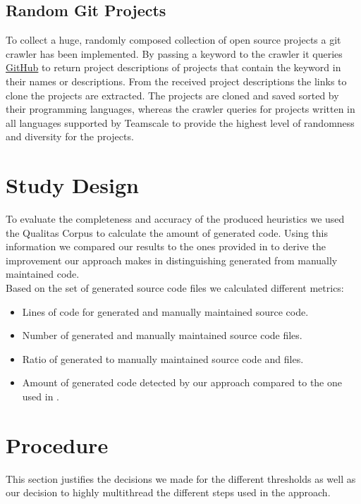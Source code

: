 \subsection{Random Git Projects}
\label{section:randomGitProjects}
To collect a huge, randomly composed collection of open source projects a git crawler has been implemented.
By passing a keyword to the crawler it queries \href{github.com}{GitHub} to return project descriptions of projects that contain the keyword in their names or descriptions. From the received project descriptions the links to clone the projects are extracted. The projects are cloned and saved sorted by their programming languages, whereas the crawler queries for projects written in all languages supported by Teamscale to provide the highest level of randomness and diversity for the projects.

\section{Study Design}

To evaluate the completeness and accuracy of the produced heuristics we used the Qualitas Corpus to calculate the amount of generated code. Using this information we compared our results to the ones provided in \cite{Bernwieser2014} to derive the improvement our approach makes in distinguishing generated from manually maintained code.\\
Based on the set of generated source code files we calculated different metrics:
\begin{itemize}
	\item Lines of code for generated and manually maintained source code.
	\item Number of generated and manually maintained source code files.
	\item Ratio of generated to manually maintained source code and files.
	\item Amount of generated code detected by our approach compared to the one used in \cite{Bernwieser2014}.
\end{itemize}

\section{Procedure}
This section justifies the decisions we made for the different thresholds as well as our decision to highly multithread the different steps used in the approach.

